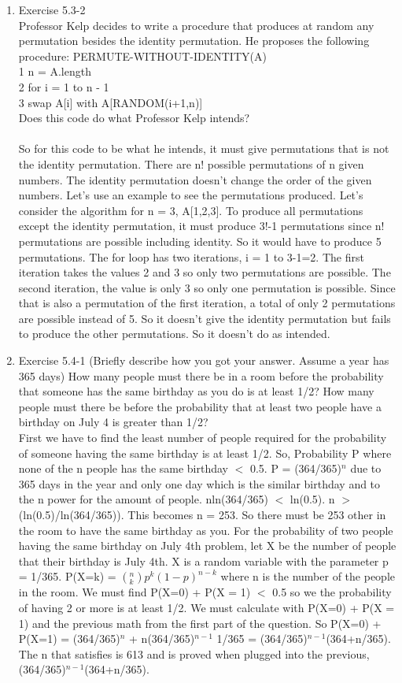 \documentclass[12pt]{article}
\begin{document}
\begin{enumerate}
\item Exercise 5.3-2 \\
Professor Kelp decides to write a procedure that produces at random any permutation
besides the identity permutation. He proposes the following procedure:
PERMUTE-WITHOUT-IDENTITY(A)\\
1 n = A.length\\
2 for i = 1 to n - 1 \\
3 swap A[i] with A[RANDOM(i+1,n)] \\
Does this code do what Professor Kelp intends? \\
\\
So for this code to be what he intends, it must give permutations that is not the identity permutation. There are n! possible permutations of n given numbers. The identity permutation doesn't change the order of the given numbers. Let's use an example to see the permutations produced. Let's consider the algorithm for n = 3, A[1,2,3]. To produce all permutations except the identity permutation, it must produce 3!-1 permutations since n! permutations are possible including identity. So it would have to produce 5 permutations. The for loop has two iterations, i = 1 to 3-1=2. The first iteration takes the values 2 and 3 so only two permutations are possible. The second iteration, the value is only 3 so only one permutation is possible. Since that is also a permutation of the first iteration, a total of only 2 permutations are possible instead of 5. So it doesn't give the identity permutation but fails to produce the other permutations. So it doesn't do as intended.

\item Exercise 5.4-1 (Briefly describe how you got your answer. Assume a year has 365 days)
How many people must there be in a room before the probability that someone has the same birthday as you do is at least 1/2? How many people must there be before the probability that at least two people have a birthday on July 4 is greater than 1/2? \\

First we have to find the least number of people required for the probability of someone having the same birthday is at least 1/2. So, Probability P where none of the n people has the same birthday $<$ 0.5. P = (364/365)$^n$ due to 365 days in the year and only one day which is the similar birthday and to the n power for the amount of people. nln(364/365) $<$ ln(0.5). n $>$ (ln(0.5)/ln(364/365)). This becomes n = 253. So there must be 253 other in the room to have the same birthday as you. For the probability of two people having the same birthday on July 4th problem, let X be the number of people that their birthday is July 4th. X is a random variable  with the parameter p = 1/365. P(X=k) = $(^n_k)p^k(1-p)^{n-k}$ where n is the number of the people in the room. We must find P(X=0) + P(X = 1) $<$ 0.5 so we the probability of having 2 or more is at least 1/2. We must calculate with P(X=0) + P(X = 1) and the previous math from the first part of the question. So P(X=0) + P(X=1) = (364/365)$^n$ + n(364/365)$^{n-1}$ 1/365 = (364/365)$^{n-1}$(364+n/365). The n that satisfies is 613 and is proved when plugged into the previous, (364/365)$^{n-1}$(364+n/365).


\end{enumerate}
\end{document}
